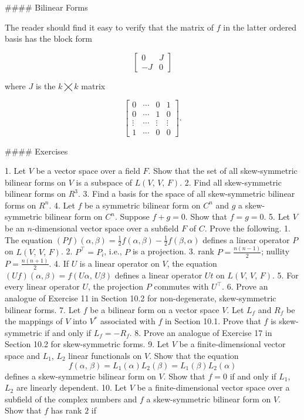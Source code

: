 

#### Bilinear Forms

The reader should find it easy to verify that the matrix of \(f\) in the latter ordered basis has the block form

\[\left[\begin{array}{cc}0&J\\ -J&0\end{array}\right]\]

where \(J\) is the \(k\bigtimes k\) matrix

\[\left[\begin{array}{cccc}0&\cdots&0&1\\ 0&\cdots&1&0\\ \vdots&\cdots&\vdots&\vdots\\ 1&\cdots&0&0\end{array}\right].\]

#### Exercises

1. Let \(V\) be a vector space over a field \(F\). Show that the set of all skew-symmetric bilinear forms on \(V\) is a subspace of \(L(V,\,V,\,F)\).
2. Find all skew-symmetric bilinear forms on \(R^{3}\).
3. Find a basis for the space of all skew-symmetric bilinear forms on \(R^{n}\).
4. Let \(f\) be a symmetric bilinear form on \(C^{n}\) and \(g\) a skew-symmetric bilinear form on \(C^{n}\). Suppose \(f+g=0\). Show that \(f=g=0\).
5. Let \(V\) be an \(n\)-dimensional vector space over a subfield \(F\) of \(C\). Prove the following. 1. The equation \((P\!f)(\alpha,\beta)=\frac{1}{2}f(\alpha,\beta)-\frac{1}{2}f(\beta,\alpha)\) defines a linear operator \(P\) on \(L(V,\,V,\,F)\). 2. \(P^{\intercal}=P_{i}\), i.e., \(P\) is a projection. 3. rank \(P=\frac{n(n-1)}{2}\); nullity \(P=\frac{n(n+1)}{2}\). 4. If \(U\) is a linear operator on \(V\), the equation \((U\!f)(\alpha,\beta)=f(U\alpha,\,U\beta)\) defines a linear operator \(U\!t\) on \(L(V,\,V,\,F)\). 5. For every linear operator \(U\), the projection \(P\) commutes with \(U^{\intercal}\).
6. Prove an analogue of Exercise 11 in Section 10.2 for non-degenerate, skew-symmetric bilinear forms.
7. Let \(f\) be a bilinear form on a vector space \(V\). Let \(L_{f}\) and \(R_{f}\) be the mappings of \(V\) into \(V^{*}\) associated with \(f\) in Section 10.1. Prove that \(f\) is skew-symmetric if and only if \(L_{f}=-R_{f}\).
8. Prove an analogue of Exercise 17 in Section 10.2 for skew-symmetric forms.
9. Let \(V\) be a finite-dimensional vector space and \(L_{1}\), \(L_{2}\) linear functionals on \(V\). Show that the equation \[f(\alpha,\,\beta)=L_{1}(\alpha)L_{2}(\beta)=L_{1}(\beta)L_{2}(\alpha)\] defines a skew-symmetric bilinear form on \(V\). Show that \(f=0\) if and only if \(L_{1}\), \(L_{2}\) are linearly dependent.
10. Let \(V\) be a finite-dimensional vector space over a subfield of the complex numbers and \(f\) a skew-symmetric bilinear form on \(V\). Show that \(f\) has rank \(2\) if